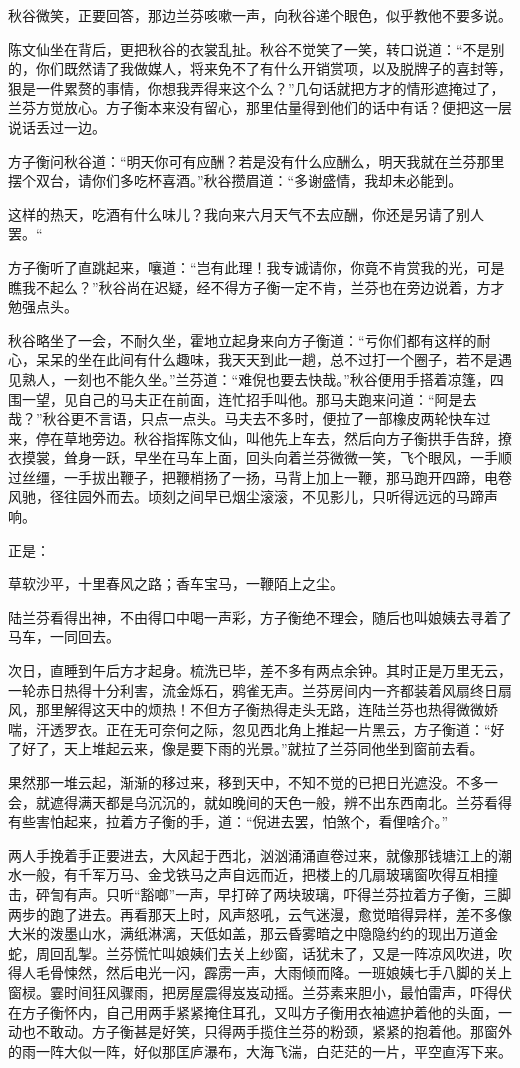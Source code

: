 \documentclass[12pt,UTF8]{ctexbook}
\begin{document}
{{{秋谷微笑，正要回答，那边兰芬咳嗽一声，向秋谷递个眼色，似乎教他不要多说。

陈文仙坐在背后，更把秋谷的衣裳乱扯。秋谷不觉笑了一笑，转口说道：“不是别的，你们既然请了我做媒人，将来免不了有什么开销赏项，以及脱牌子的喜封等，狠是一件累赘的事情，你想我弄得来这个么？”几句话就把方才的情形遮掩过了，兰芬方觉放心。方子衡本来没有留心，那里估量得到他们的话中有话？便把这一层说话丢过一边。

方子衡问秋谷道：“明天你可有应酬？若是没有什么应酬么，明天我就在兰芬那里摆个双台，请你们多吃杯喜酒。”秋谷攒眉道：“多谢盛情，我却未必能到。

这样的热天，吃酒有什么味儿？我向来六月天气不去应酬，你还是另请了别人罢。“

方子衡听了直跳起来，嚷道：“岂有此理！我专诚请你，你竟不肯赏我的光，可是瞧我不起么？”秋谷尚在迟疑，经不得方子衡一定不肯，兰芬也在旁边说着，方才勉强点头。

秋谷略坐了一会，不耐久坐，霍地立起身来向方子衡道：“亏你们都有这样的耐心，呆呆的坐在此间有什么趣味，我天天到此一趟，总不过打一个圈子，若不是遇见熟人，一刻也不能久坐。”兰芬道：“难倪也要去快哉。”秋谷便用手搭着凉篷，四围一望，见自己的马夫正在前面，连忙招手叫他。那马夫跑来问道：“阿是去哉？”秋谷更不言语，只点一点头。马夫去不多时，便拉了一部橡皮两轮快车过来，停在草地旁边。秋谷指挥陈文仙，叫他先上车去，然后向方子衡拱手告辞，撩衣摸裳，耸身一跃，早坐在马车上面，回头向着兰芬微微一笑，飞个眼风，一手顺过丝缰，一手拔出鞭子，把鞭梢扬了一扬，马背上加上一鞭，那马跑开四蹄，电卷风驰，径往园外而去。顷刻之间早已烟尘滚滚，不见影儿，只听得远远的马蹄声响。

正是：

草软沙平，十里春风之路；香车宝马，一鞭陌上之尘。

陆兰芬看得出神，不由得口中喝一声彩，方子衡绝不理会，随后也叫娘姨去寻着了马车，一同回去。

次日，直睡到午后方才起身。梳洗已毕，差不多有两点余钟。其时正是万里无云，一轮赤日热得十分利害，流金烁石，鸦雀无声。兰芬房间内一齐都装着风扇终日扇风，那里解得这天中的烦热！不但方子衡热得走头无路，连陆兰芬也热得微微娇喘，汗透罗衣。正在无可奈何之际，忽见西北角上推起一片黑云，方子衡道：“好了好了，天上堆起云来，像是要下雨的光景。”就拉了兰芬同他坐到窗前去看。

果然那一堆云起，渐渐的移过来，移到天中，不知不觉的已把日光遮没。不多一会，就遮得满天都是乌沉沉的，就如晚间的天色一般，辨不出东西南北。兰芬看得有些害怕起来，拉着方子衡的手，道：“倪进去罢，怕煞个，看俚啥介。”

两人手挽着手正要进去，大风起于西北，汹汹涌涌直卷过来，就像那钱塘江上的潮水一般，有千军万马、金戈铁马之声自远而近，把楼上的几扇玻璃窗吹得互相撞击，砰訇有声。只听“豁啷”一声，早打碎了两块玻璃，吓得兰芬拉着方子衡，三脚两步的跑了进去。再看那天上时，风声怒吼，云气迷漫，愈觉暗得异样，差不多像大米的泼墨山水，满纸淋漓，天低如盖，那云昏雾暗之中隐隐约约的现出万道金蛇，周回乱掣。兰芬慌忙叫娘姨们去关上纱窗，话犹未了，又是一阵凉风吹进，吹得人毛骨悚然，然后电光一闪，霹雳一声，大雨倾而降。一班娘姨七手八脚的关上窗棂。霎时间狂风骤雨，把房屋震得岌岌动摇。兰芬素来胆小，最怕雷声，吓得伏在方子衡怀内，自己用两手紧紧掩住耳孔，又叫方子衡用衣袖遮护着他的头面，一动也不敢动。方子衡甚是好笑，只得两手揽住兰芬的粉颈，紧紧的抱着他。那窗外的雨一阵大似一阵，好似那匡庐瀑布，大海飞湍，白茫茫的一片，平空直泻下来。

}}}
\end{document}
